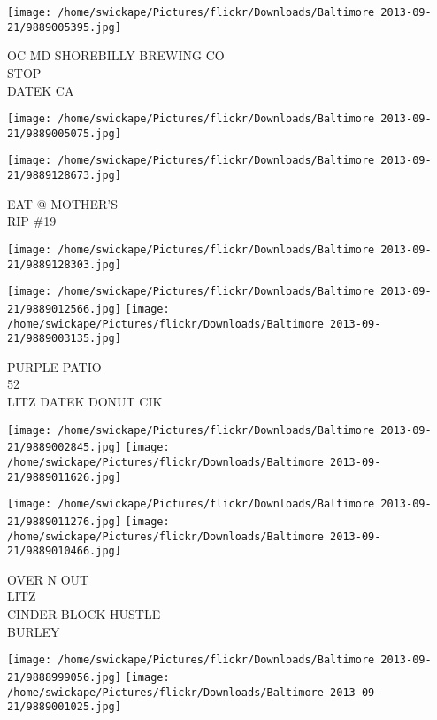 \documentclass[10pt,letterpaper]{article}
\begin{document}
\vspace{0.25in}
\texttt{[image: /home/swickape/Pictures/flickr/Downloads/Baltimore 2013-09-21/9889005395.jpg]}

OC MD SHOREBILLY BREWING CO\\
STOP\\
DATEK CA\\
\pagebreak

\texttt{[image: /home/swickape/Pictures/flickr/Downloads/Baltimore 2013-09-21/9889005075.jpg]}

\vspace{0.25in}
\texttt{[image: /home/swickape/Pictures/flickr/Downloads/Baltimore 2013-09-21/9889128673.jpg]}

EAT @ MOTHER'S\\
RIP \#19\\
\pagebreak

\texttt{[image: /home/swickape/Pictures/flickr/Downloads/Baltimore 2013-09-21/9889128303.jpg]}

\vspace{0.25in}
\texttt{[image: /home/swickape/Pictures/flickr/Downloads/Baltimore 2013-09-21/9889012566.jpg]}
\texttt{[image: /home/swickape/Pictures/flickr/Downloads/Baltimore 2013-09-21/9889003135.jpg]}

PURPLE PATIO\\
52\\
LITZ DATEK DONUT CIK\\
\pagebreak

\texttt{[image: /home/swickape/Pictures/flickr/Downloads/Baltimore 2013-09-21/9889002845.jpg]}
\texttt{[image: /home/swickape/Pictures/flickr/Downloads/Baltimore 2013-09-21/9889011626.jpg]}

\texttt{[image: /home/swickape/Pictures/flickr/Downloads/Baltimore 2013-09-21/9889011276.jpg]}
\texttt{[image: /home/swickape/Pictures/flickr/Downloads/Baltimore 2013-09-21/9889010466.jpg]}

OVER N OUT\\
LITZ\\
CINDER BLOCK HUSTLE\\
BURLEY\\
\pagebreak

\texttt{[image: /home/swickape/Pictures/flickr/Downloads/Baltimore 2013-09-21/9888999056.jpg]}
\texttt{[image: /home/swickape/Pictures/flickr/Downloads/Baltimore 2013-09-21/9889001025.jpg]}
\end{document}
